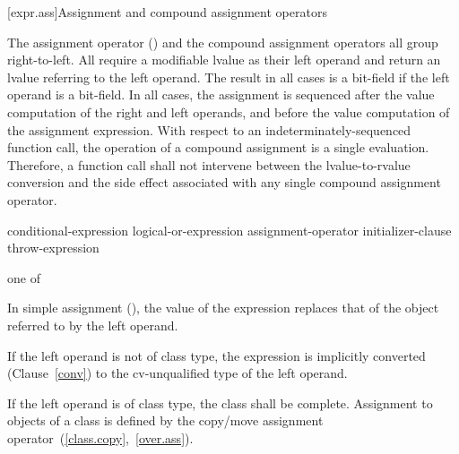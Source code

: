 [expr.ass]{Assignment and compound assignment operators}%

\pnum
{}%
%
%
%
%
%
%
%
%
%
%
%
The assignment operator (\tcode{=}) and the compound assignment
operators all group right-to-left.
%
All
require a modifiable lvalue as their left operand and return an lvalue
referring to the left operand. The result in all cases is a bit-field if
the left operand is a bit-field. In all cases, the assignment is
sequenced after the
%
value computation of the right and left operands,
and before the
value computation of the assignment expression. With
respect to an indeterminately-sequenced function call, the operation of
a compound assignment is a single evaluation.
\enternote
Therefore, a function call shall not intervene between the
lvalue-to-rvalue conversion and the side effect associated with any
single compound assignment operator.
\exitnote

\begin{bnf}
\br
    conditional-expression\br
    logical-or-expression assignment-operator initializer-clause\br
    throw-expression
\end{bnf}

\begin{bnf}
 \textnormal{one of}\br
    \terminal{=  *=  /=  \%=   +=  -=  \shr=  \shl=  \&=  \^{}=  |=}
\end{bnf}

\pnum
In simple assignment (\tcode{=}), the value of the expression replaces
that of the object referred to by the left operand.

\pnum
{}%
If the left operand is not of class type, the expression is implicitly
converted (Clause~\ref{conv}) to the cv-unqualified type of the left
operand.

\pnum
{}%
%
If the left operand is of class type, the class shall be complete.
Assignment to objects of a class is defined by the copy/move assignment
operator~(\ref{class.copy},~\ref{over.ass}).

